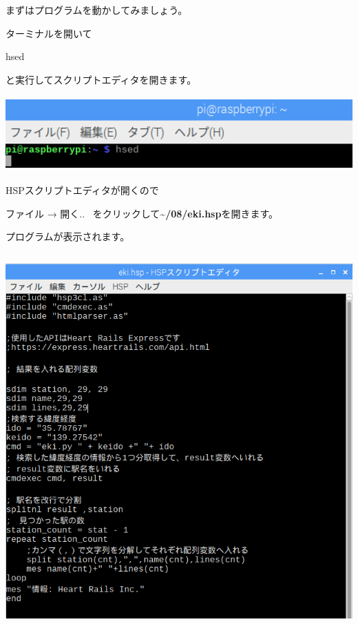 \documentclass[a4paper,12pt,dvipdfmx]{jarticle}
\begin{document}
\bigskip


\bigskip

\clearpage
まずはプログラムを動かしてみましょう。

ターミナルを開いて

hsed

と実行してスクリプトエディタを開きます。



\begin{center}
\includegraphics[width=17.057cm,height=2.866cm]{textbook-img013.png}

\end{center}
HSPスクリプトエディタが開くので

ファイル → 開く..
\ をクリックして\textbf{\~{}/08/eki.hsp}を開きます。

プログラムが表示されます。



\begin{center}
\includegraphics[width=13.377cm,height=14.356cm]{textbook-img050.png}

\end{center}
\end{document}
